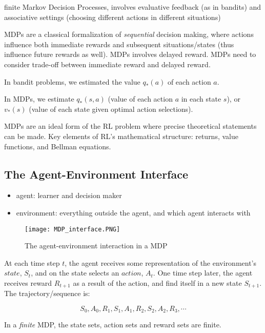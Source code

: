 \documentclass[lang=en,mode=geye,device=normal,color=blue,14pt]{elegantnote}
\DeclareMathOperator*{\1}{\mathbbm{1}}
\begin{document}
\begin{definition}
finite Markov Decision Processes, involves evaluative feedback (as in bandits) and associative settings (choosing different actions in different situations)
\end{definition}

MDPs are a classical formalization of \textit{sequential} decision making, where actions influence both immediate rewards and subsequent situations/states (thus influence future rewards as well).
MDPs involves delayed reward. MDPs need to consider trade-off between immediate reward and delayed reward.

In bandit problems, we estimated the value $q_{*}(a)$ of each action $a$.

In MDPs, we estimate $q_{*}(s,a)$ (value of each action $a$ in each state $s$), or $v_{*}(s)$ (value of each state given optimal action selections).

MDPs are an ideal form of the RL problem where precise theoretical statements can be made.
Key elements of RL's mathematical structure: returns, value functions, and Bellman equations.

\subsection{The Agent-Environment Interface}

\begin{itemize}
\item agent: learner and decision maker
\item environment: everything outside the agent, and which agent interacts with
\end{itemize}

\begin{figure}[!h]
  \texttt{[image: MDP\_interface.PNG]}
  \caption{The agent-environment interaction in a MDP}
  \label{fig:MDP_interface}
\end{figure}

At each time step $t$, the agent receives some representation of the environment's $state$, $S_t$, and on the state selects an $action$, $A_t$. One time step later, the agent receives reward $R_{t+1}$ as a result of the action, and find itself in a new state $S_{t+1}$. The trajectory/sequence is:

$$ S_0, A_0, R_1, S_1, A_1, R_2, S_2, A_2, R_3, \cdots $$

In a \textit{finite} MDP, the state sets, action sets and reward sets are finite.
\end{document}
